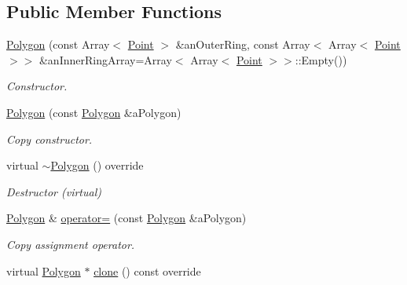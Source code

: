 \subsection*{Public Member Functions}
\begin{DoxyCompactItemize}
\item 
\hyperlink{classlibrary_1_1math_1_1geom_1_1d2_1_1objects_1_1_polygon_ad2a0b0bcd5301dbcd9e2fa101fbd220b}{Polygon} (const Array$<$ \hyperlink{classlibrary_1_1math_1_1geom_1_1d2_1_1objects_1_1_point}{Point} $>$ \&an\+Outer\+Ring, const Array$<$ Array$<$ \hyperlink{classlibrary_1_1math_1_1geom_1_1d2_1_1objects_1_1_point}{Point} $>$$>$ \&an\+Inner\+Ring\+Array=Array$<$ Array$<$ \hyperlink{classlibrary_1_1math_1_1geom_1_1d2_1_1objects_1_1_point}{Point} $>$$>$\+::Empty())
\begin{DoxyCompactList}\small\item\em Constructor. \end{DoxyCompactList}\item 
\hyperlink{classlibrary_1_1math_1_1geom_1_1d2_1_1objects_1_1_polygon_a6384fadfb81c792d137693e8f0dd14f9}{Polygon} (const \hyperlink{classlibrary_1_1math_1_1geom_1_1d2_1_1objects_1_1_polygon}{Polygon} \&a\+Polygon)
\begin{DoxyCompactList}\small\item\em Copy constructor. \end{DoxyCompactList}\item 
virtual \hyperlink{classlibrary_1_1math_1_1geom_1_1d2_1_1objects_1_1_polygon_ab384278ae8b6089c45a79856f71370ca}{$\sim$\+Polygon} () override
\begin{DoxyCompactList}\small\item\em Destructor (virtual) \end{DoxyCompactList}\item 
\hyperlink{classlibrary_1_1math_1_1geom_1_1d2_1_1objects_1_1_polygon}{Polygon} \& \hyperlink{classlibrary_1_1math_1_1geom_1_1d2_1_1objects_1_1_polygon_afd72b5c2aa958835958d197ee57c3152}{operator=} (const \hyperlink{classlibrary_1_1math_1_1geom_1_1d2_1_1objects_1_1_polygon}{Polygon} \&a\+Polygon)
\begin{DoxyCompactList}\small\item\em Copy assignment operator. \end{DoxyCompactList}\item 
virtual \hyperlink{classlibrary_1_1math_1_1geom_1_1d2_1_1objects_1_1_polygon}{Polygon} $\ast$ \hyperlink{classlibrary_1_1math_1_1geom_1_1d2_1_1objects_1_1_polygon_a15bbbe7e468a50d6059e2df946175e1c}{clone} () const override

\end{DoxyCompactItemize}
